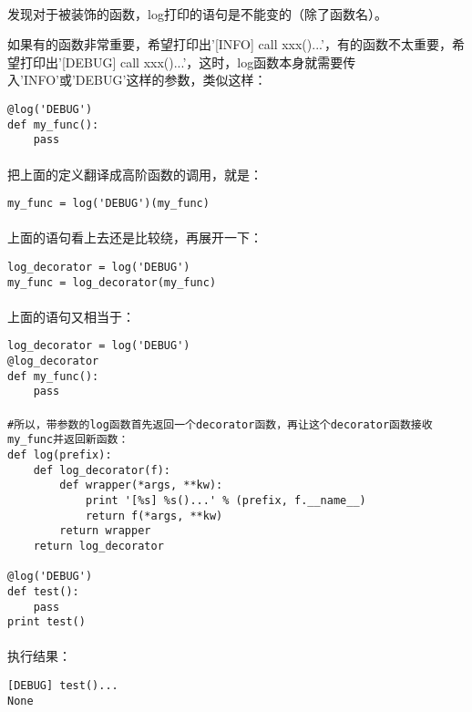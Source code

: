 \documentclass{article}
\begin{document}
\begin{CJK}{UTF8}{gbsn}
\paragraph{}
发现对于被装饰的函数，log打印的语句是不能变的（除了函数名）。

如果有的函数非常重要，希望打印出'[INFO] call xxx()...'，有的函数不太重要，希望打印出'[DEBUG] call xxx()...'，这时，log函数本身就需要传入'INFO'或'DEBUG'这样的参数，类似这样：
\begin{verbatim}
@log('DEBUG')
def my_func():
    pass
\end{verbatim}
\paragraph{}
把上面的定义翻译成高阶函数的调用，就是：
\begin{verbatim}
my_func = log('DEBUG')(my_func)
\end{verbatim}
\paragraph{}
上面的语句看上去还是比较绕，再展开一下：
\begin{verbatim}
log_decorator = log('DEBUG')
my_func = log_decorator(my_func)
\end{verbatim}
\paragraph{}
上面的语句又相当于：
\begin{verbatim}
log_decorator = log('DEBUG')
@log_decorator
def my_func():
    pass
\end{verbatim}
\paragraph{}
\begin{verbatim}
#所以，带参数的log函数首先返回一个decorator函数，再让这个decorator函数接收my_func并返回新函数：
def log(prefix):
    def log_decorator(f):
        def wrapper(*args, **kw):
            print '[%s] %s()...' % (prefix, f.__name__)
            return f(*args, **kw)
        return wrapper
    return log_decorator

@log('DEBUG')
def test():
    pass
print test()
\end{verbatim}
\paragraph{}
执行结果：
\begin{verbatim}
[DEBUG] test()...
None
\end{verbatim}

\end{CJK}
\end{document}
